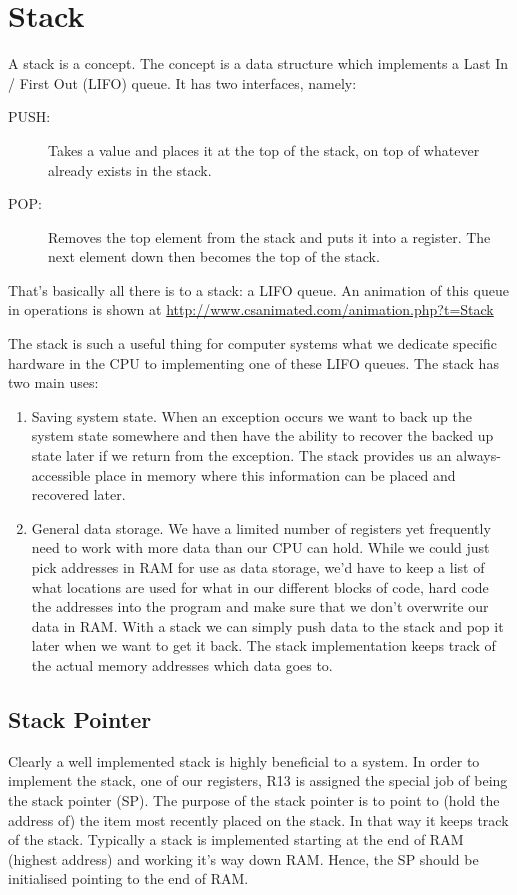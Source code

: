 \chapter{Stack}
A stack is a concept. The concept is a data structure which implements a Last In / First Out (LIFO) queue. It has two interfaces, namely:
\begin{description}
    \item[PUSH:] Takes a value and places it at the top of the stack, on top of whatever already exists in the stack.
    \item[POP:] Removes the top element from the stack and puts it into a register. The next element down then becomes the top of the stack.
\end{description}

That's basically all there is to a stack: a LIFO queue. An animation of this queue in operations is shown at \url{http://www.csanimated.com/animation.php?t=Stack}

The stack is such a useful thing for computer systems what we dedicate specific hardware in the CPU to implementing one of these LIFO queues. The stack has two main uses:
\begin{enumerate}
    \item Saving system state. When an exception occurs we want to back up the system state somewhere and then have the ability to recover the backed up state later if we return from the exception. The stack provides us an always-accessible place in memory where this information can be placed and recovered later.
    \item General data storage. We have a limited number of registers yet frequently need to work with more data than our CPU can hold. While we could just pick addresses in RAM for use as data storage, we'd have to keep a list of what locations are used for what in our different blocks of code, hard code the addresses into the program and make sure that we don't overwrite our data in RAM. With a stack we can simply push data to the stack and pop it later when we want to get it back. The stack implementation keeps track of the actual memory addresses which data goes to. 
\end{enumerate}

\section{Stack Pointer}
Clearly a well implemented stack is highly beneficial to a system. In order to implement the stack, one of our registers, R13 is assigned the special job of being the stack pointer (SP). The purpose of the stack pointer is to point to (hold the address of) the item most recently placed on the stack. In that way it keeps track of the stack. Typically a stack is implemented starting at the end of RAM (highest address) and working it's way down RAM. Hence, the SP should be initialised pointing to the end of RAM.

